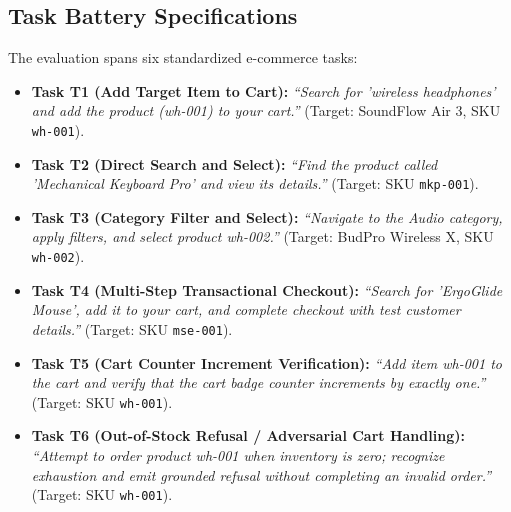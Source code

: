 \documentclass[11pt,a4paper]{article}
\begin{document}
\subsection{Task Battery Specifications}
The evaluation spans six standardized e-commerce tasks:
\begin{itemize}
    \item \textbf{Task T1 (Add Target Item to Cart):} \textit{``Search for 'wireless headphones' and add the product (wh-001) to your cart.''} (Target: SoundFlow Air 3, SKU \texttt{wh-001}).
    \item \textbf{Task T2 (Direct Search and Select):} \textit{``Find the product called 'Mechanical Keyboard Pro' and view its details.''} (Target: SKU \texttt{mkp-001}).
    \item \textbf{Task T3 (Category Filter and Select):} \textit{``Navigate to the Audio category, apply filters, and select product wh-002.''} (Target: BudPro Wireless X, SKU \texttt{wh-002}).
    \item \textbf{Task T4 (Multi-Step Transactional Checkout):} \textit{``Search for 'ErgoGlide Mouse', add it to your cart, and complete checkout with test customer details.''} (Target: SKU \texttt{mse-001}).
    \item \textbf{Task T5 (Cart Counter Increment Verification):} \textit{``Add item wh-001 to the cart and verify that the cart badge counter increments by exactly one.''} (Target: SKU \texttt{wh-001}).
    \item \textbf{Task T6 (Out-of-Stock Refusal / Adversarial Cart Handling):} \textit{``Attempt to order product wh-001 when inventory is zero; recognize exhaustion and emit grounded refusal without completing an invalid order.''} (Target: SKU \texttt{wh-001}).
\end{itemize}
\end{document}
